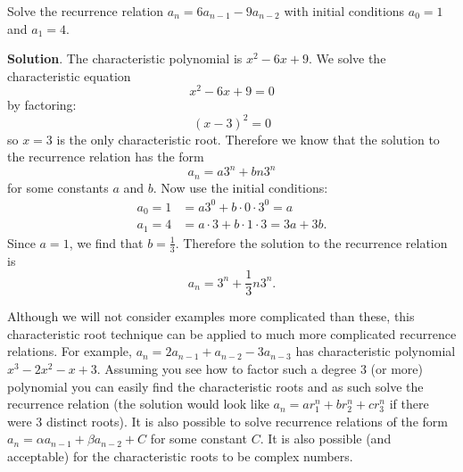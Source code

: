 \documentclass[11pt,]{book}
\theoremstyle{ptxplainnotitle}
\theoremstyle{ptxplaintitle}
\theoremstyle{ptxdefinitionnotitle}
\theoremstyle{ptxdefinitiontitle}
\theoremstyle{ptxdefinitionnotitle}
\theoremstyle{ptxdefinitiontitle}
\theoremstyle{ptxdefinitionnotitle}
\theoremstyle{ptxdefinitiontitle}
\theoremstyle{ptxdefinitiontitlenonumber}
\theoremstyle{ptxdefinitiontitlenonumber}
\numberwithin{equation}{chapter}
\newcommand{\amp}{&}
\begin{document}
\begin{example}\label{example-24}
\hypertarget{p-467}{}%
Solve the recurrence relation \(a_n = 6a_{n-1} - 9a_{n-2}\) with initial conditions \(a_0 = 1\) and \(a_1 = 4\).%
\par\smallskip%
\noindent\textbf{Solution}.\hypertarget{solution-63}{}\quad%
\hypertarget{p-468}{}%
The characteristic polynomial is \(x^2 - 6x + 9\). We solve the characteristic equation%
\begin{equation*}
x^2 - 6x + 9 = 0
\end{equation*}
by factoring:%
\begin{equation*}
(x - 3)^2 = 0
\end{equation*}
so \(x =3\) is the only characteristic root. Therefore we know that the solution to the recurrence relation has the form%
\begin{equation*}
a_n = a 3^n + bn3^n
\end{equation*}
for some constants \(a\) and \(b\). Now use the initial conditions:%
\begin{align*}
a_0 = 1 \amp = a 3^0 + b\cdot 0 \cdot 3^0 = a\\
a_1 = 4 \amp = a\cdot 3 + b\cdot 1 \cdot3 = 3a + 3b.
\end{align*}
Since \(a = 1\), we find that \(b = \frac{1}{3}\). Therefore the solution to the recurrence relation is%
\begin{equation*}
a_n = 3^n + \frac{1}{3}n3^n.
\end{equation*}
%
\end{example}
\hypertarget{p-469}{}%
Although we will not consider examples more complicated than these, this characteristic root technique can be applied to much more complicated recurrence relations. For example, \(a_n = 2a_{n-1} + a_{n-2} - 3a_{n-3}\) has characteristic polynomial \(x^3 - 2 x^2 - x + 3\). Assuming you see how to factor such a degree 3 (or more) polynomial you can easily find the characteristic roots and as such solve the recurrence relation (the solution would look like \(a_n = ar_1^n + br_2^n + cr_3^n\) if there were 3 distinct roots). It is also possible to solve recurrence relations of the form \(a_n = \alpha a_{n-1} + \beta a_{n-2} + C\) for some constant \(C\). It is also possible (and acceptable) for the characteristic roots to be complex numbers.%
\typeout{************************************************}
\typeout{************************************************}
\end{document}
